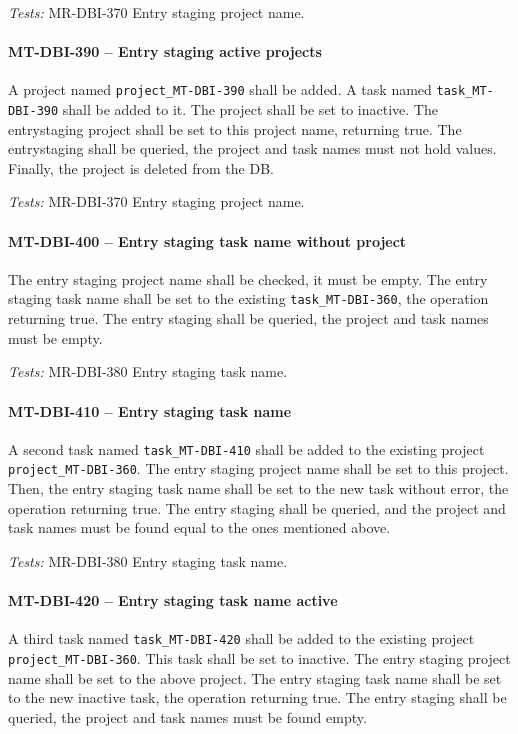 \textit{Tests: } MR-DBI-370 Entry staging project name.

\paragraph{MT-DBI-390 -- Entry staging active projects}
A project named \lstinline{project_MT-DBI-390} shall be added.
A task named \lstinline{task_MT-DBI-390} shall be added to it.
The project shall be set to inactive.
The entrystaging project shall be set to this project name,
returning true.
The entrystaging shall be queried, the project and task names
must not hold values.
Finally, the project is deleted from the DB.

\textit{Tests: } MR-DBI-370 Entry staging project name.

\paragraph{MT-DBI-400 -- Entry staging task name without project}
The entry staging project name shall be checked, it must be empty.
The entry staging task name shall be set to the existing
\lstinline{task_MT-DBI-360}, the operation returning true.
The entry staging shall be queried, the project and task names
must be empty.

\textit{Tests: } MR-DBI-380 Entry staging task name.

\paragraph{MT-DBI-410 -- Entry staging task name}
A second task named \lstinline{task_MT-DBI-410}
shall be added to the existing project \lstinline{project_MT-DBI-360}.
The entry staging project name shall be set to this project.
Then, the entry staging task name shall be set to the new task
without error, the operation returning true.
The entry staging shall be queried, and the project and task
names must be found equal to the ones mentioned above.

\textit{Tests: } MR-DBI-380 Entry staging task name.

\paragraph{MT-DBI-420 -- Entry staging task name active}
A third task named \lstinline{task_MT-DBI-420}
shall be added to the existing project \lstinline{project_MT-DBI-360}.
This task shall be set to inactive.
The entry staging project name shall be set to the above project.
The entry staging task name shall be set to the new inactive task,
the operation returning true.
The entry staging shall be queried, the project and task names
must be found empty.

